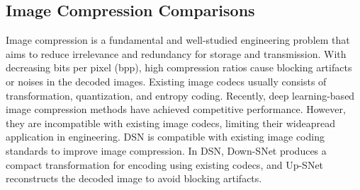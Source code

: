 \documentclass[runningheads]{llncs}
\begin{document}
\subsection{Image Compression Comparisons}

Image compression is a fundamental and well-studied engineering problem that aims to reduce irrelevance and redundancy for storage and transmission. With decreasing bits per pixel (bpp), high compression ratios cause blocking artifacts or noises in the decoded images. Existing image codecs usually consists of transformation, quantization, and entropy coding. Recently, deep learning-based image compression methods \cite{theis2017lossy,balle2016end} have achieved competitive performance. However, they are incompatible with existing image codecs, limiting their wideapread application in engineering. DSN is compatible with existing image coding standards to improve image compression. In DSN, Down-SNet produces a compact transformation for encoding using existing codecs, and Up-SNet reconstructs the decoded image to avoid blocking artifacts.
\end{document}
